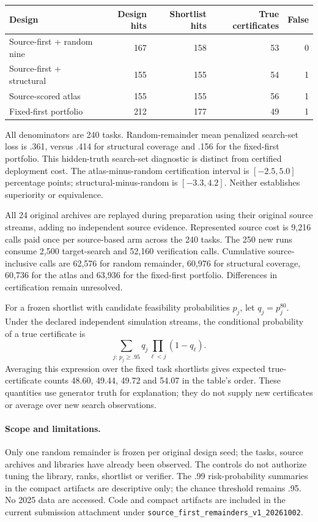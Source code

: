 \begin{center}
\begin{tabular}{lrrrr}
\toprule
Design & Design hits & Shortlist hits & True certificates & False \\
\midrule
Source-first + random nine & 167 & 158 & 53 & 0 \\
Source-first + structural & 155 & 155 & 54 & 1 \\
Source-scored atlas & 155 & 155 & 56 & 1 \\
Fixed-first portfolio & 212 & 177 & 49 & 1 \\
\bottomrule
\end{tabular}
\end{center}
All denominators are 240 tasks.  Random-remainder mean penalized search-set
loss is .361, versus .414 for structural coverage and .156 for the
fixed-first portfolio.  This hidden-truth search-set diagnostic is distinct
from certified deployment cost.  The atlas-minus-random certification
interval is $[-2.5,5.0]$ percentage points; structural-minus-random is
$[-3.3,4.2]$.  Neither establishes superiority or equivalence.

All 24 original archives are replayed during preparation using their original
source streams, adding no independent source evidence.  Represented source
cost is 9,216 calls paid once per source-based arm across the 240 tasks.
The 250 new runs consume 2,500 target-search and 52,160 verification calls.
Cumulative source-inclusive calls are 62,576 for random remainder,
60,976 for structural coverage, 60,736 for the atlas and 63,936 for the
fixed-first portfolio.  Differences in certification remain unresolved.

For a frozen shortlist with candidate feasibility probabilities $p_j$, let
$q_j=p_j^{80}$.  Under the declared independent simulation streams, the
conditional probability of a true certificate is
\[
 \sum_{j:\,p_j\ge .95}q_j\prod_{\ell<j}(1-q_\ell).
\]
Averaging this expression over the fixed task shortlists gives expected
true-certificate counts 48.60, 49.44, 49.72 and 54.07 in the table's order.
These quantities use generator truth for explanation; they do not supply
new certificates or average over new search observations.

\paragraph{Scope and limitations.}
Only one random remainder is frozen per original design seed; the tasks,
source archives and libraries have already been observed.  The controls do
not authorize tuning the library, ranks, shortlist or verifier.  The .99
risk-probability summaries in the compact artifacts are descriptive only;
the chance threshold remains .95.  No 2025 data are accessed.  Code and
compact artifacts are included in the current submission attachment
under \texttt{source\_first\_remainders\_v1\_20261002}.
